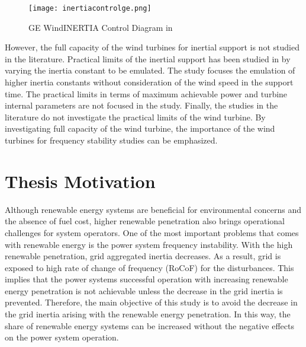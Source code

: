 \begin{figure}[h!]
	\centering
	\texttt{[image: inertiacontrolge.png]}
	\caption{GE WindINERTIA Control Diagram in \cite{Clark2009}}
	\label{inertiacontrolge}
\end{figure}
However, the full capacity of the wind turbines for inertial support is not studied in the literature. Practical limits of the inertial support has been studied in \cite{Gonzalez-Longatt2016} by varying the inertia constant to be emulated. The study focuses the emulation of higher inertia constants without consideration of the wind speed in the support time. The practical limits in terms of maximum achievable power and turbine internal parameters are not focused in the study. Finally, the studies in the literature do not investigate the practical limits of the wind turbine. By investigating full capacity of the wind turbine, the importance of the wind turbines for frequency stability studies can be emphasized. 
\section{Thesis Motivation}
Although renewable energy systems are beneficial for environmental concerns and the absence of fuel cost, higher renewable penetration also brings operational challenges for system operators. One of the most important problems that comes with renewable energy is the power system frequency instability. With the high renewable penetration, grid aggregated inertia decreases. As a result, grid is exposed to high rate of change of frequency (RoCoF) for the disturbances. This implies that the power systems successful operation with increasing renewable energy penetration is not achievable unless the decrease in the grid inertia is prevented. Therefore, the main objective of this study is to avoid the decrease in the grid inertia arising with the renewable energy penetration. In this way, the share of renewable energy systems can be increased without the negative effects on the power system operation.

